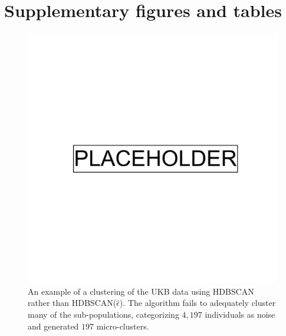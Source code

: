 \section{Supplementary figures and tables}

\begin{figure}[ht]
  \centering
\includegraphics[width=0.7\linewidth]{placeholder.png}
  \caption[Clustering the UKB with basic HDBSCAN]{An example of a clustering of the UKB data using HDBSCAN rather than HDBSCAN($\hat{\epsilon}$). The algorithm fails to adequately cluster many of the sub-populations, categorizing $4,197$ individuals as noise and generated $197$ micro-clusters.}
    \label{fig:supp_ukb_hdbscan_original}  
\end{figure}

\clearpage

